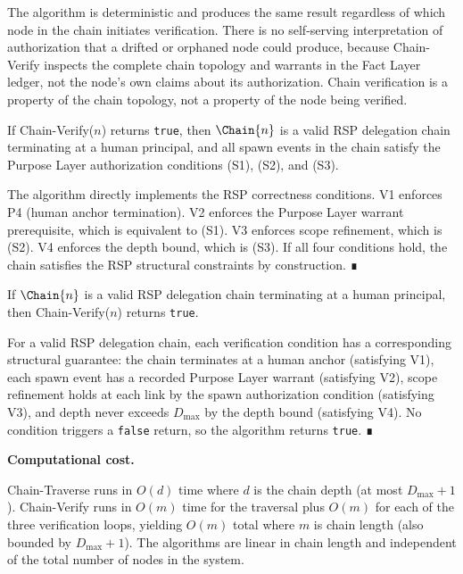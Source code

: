 The algorithm is deterministic and produces the same result regardless of which node in the chain initiates verification. There is no self-serving interpretation of authorization that a drifted or orphaned node could produce, because Chain-Verify inspects the complete chain topology and warrants in the Fact Layer ledger, not the node's own claims about its authorization. Chain verification is a property of the chain topology, not a property of the node being verified.

\begin{prop}
\label{prop:chain-verify-soundness}
If Chain-Verify($n$) returns \texttt{true}, then $\Chain{n}$ is a valid RSP delegation chain terminating at a human principal, and all spawn events in the chain satisfy the Purpose Layer authorization conditions (S1), (S2), and (S3).
\end{prop}
\begin{pf}
The algorithm directly implements the RSP correctness conditions. V1 enforces P4 (human anchor termination). V2 enforces the Purpose Layer warrant prerequisite, which is equivalent to (S1). V3 enforces scope refinement, which is (S2). V4 enforces the depth bound, which is (S3). If all four conditions hold, the chain satisfies the RSP structural constraints by construction. ∎
\end{pf}

\begin{prop}
\label{prop:chain-verify-completeness}
If $\Chain{n}$ is a valid RSP delegation chain terminating at a human principal, then Chain-Verify($n$) returns \texttt{true}.
\end{prop}
\begin{pf}
For a valid RSP delegation chain, each verification condition has a corresponding structural guarantee: the chain terminates at a human anchor (satisfying V1), each spawn event has a recorded Purpose Layer warrant (satisfying V2), scope refinement holds at each link by the spawn authorization condition (satisfying V3), and depth never exceeds $D_{\max}$ by the depth bound (satisfying V4). No condition triggers a \texttt{false} return, so the algorithm returns \texttt{true}. ∎
\end{pf}

\bigskip
\noindent\textbf{Computational cost.}

Chain-Traverse runs in $O(d)$ time where $d$ is the chain depth (at most $D_{\max} + 1$). Chain-Verify runs in $O(m)$ time for the traversal plus $O(m)$ for each of the three verification loops, yielding $O(m)$ total where $m$ is chain length (also bounded by $D_{\max} + 1$). The algorithms are linear in chain length and independent of the total number of nodes in the system.

